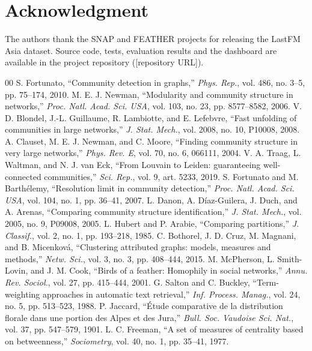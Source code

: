 \documentclass[conference]{IEEEtran}
\begin{document}
\section*{Acknowledgment}
The authors thank the SNAP and FEATHER projects for releasing the LastFM Asia dataset. Source code, tests, evaluation results and the dashboard are available in the project repository ({[}repository URL{]}).

\begin{thebibliography}{00}
 S. Fortunato, ``Community detection in graphs,'' \emph{Phys. Rep.}, vol. 486, no. 3--5, pp. 75--174, 2010.
 M. E. J. Newman, ``Modularity and community structure in networks,'' \emph{Proc. Natl. Acad. Sci. USA}, vol. 103, no. 23, pp. 8577--8582, 2006.
 V. D. Blondel, J.-L. Guillaume, R. Lambiotte, and E. Lefebvre, ``Fast unfolding of communities in large networks,'' \emph{J. Stat. Mech.}, vol. 2008, no. 10, P10008, 2008.
 A. Clauset, M. E. J. Newman, and C. Moore, ``Finding community structure in very large networks,'' \emph{Phys. Rev. E}, vol. 70, no. 6, 066111, 2004.
 V. A. Traag, L. Waltman, and N. J. van Eck, ``From Louvain to Leiden: guaranteeing well-connected communities,'' \emph{Sci. Rep.}, vol. 9, art. 5233, 2019.
 S. Fortunato and M. Barth\'elemy, ``Resolution limit in community detection,'' \emph{Proc. Natl. Acad. Sci. USA}, vol. 104, no. 1, pp. 36--41, 2007.
 L. Danon, A. D\'iaz-Guilera, J. Duch, and A. Arenas, ``Comparing community structure identification,'' \emph{J. Stat. Mech.}, vol. 2005, no. 9, P09008, 2005.
 L. Hubert and P. Arabie, ``Comparing partitions,'' \emph{J. Classif.}, vol. 2, no. 1, pp. 193--218, 1985.
 C. Bothorel, J. D. Cruz, M. Magnani, and B. Micenkov\'a, ``Clustering attributed graphs: models, measures and methods,'' \emph{Netw. Sci.}, vol. 3, no. 3, pp. 408--444, 2015.
 M. McPherson, L. Smith-Lovin, and J. M. Cook, ``Birds of a feather: Homophily in social networks,'' \emph{Annu. Rev. Sociol.}, vol. 27, pp. 415--444, 2001.
 G. Salton and C. Buckley, ``Term-weighting approaches in automatic text retrieval,'' \emph{Inf. Process. Manag.}, vol. 24, no. 5, pp. 513--523, 1988.
 P. Jaccard, ``\'Etude comparative de la distribution florale dans une portion des Alpes et des Jura,'' \emph{Bull. Soc. Vaudoise Sci. Nat.}, vol. 37, pp. 547--579, 1901.
 L. C. Freeman, ``A set of measures of centrality based on betweenness,'' \emph{Sociometry}, vol. 40, no. 1, pp. 35--41, 1977.

\end{thebibliography}
\end{document}
